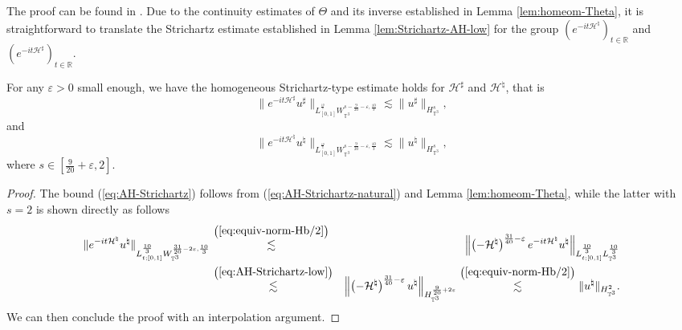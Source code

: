 The proof can be found in \cite[Lemma 3.5]{de2025stochastic}. Due to the continuity estimates of $\Theta$ and its inverse established in
Lemma \ref{lem:homeom-Theta}, it is straightforward to translate the
Strichartz estimate established in Lemma \ref{lem:Strichartz-AH-low} for the
group $(e^{- i t \mathcal{H}^{\natural}})_{t \in \mathbb{R}}$ and $(e^{- i t
\mathcal{H}^{\sharp}})_{t \in \mathbb{R}}$.

\begin{cor}
  \label{cor:anderson-strichartz}For any $\varepsilon > 0$ small enough, we have the
  homogeneous Strichartz-type estimate holds for $\mathcal{H}^{\sharp}$ and
  $\mathcal{H}^{\natural}$, that is
  \begin{equation}
    \| e^{- i t \mathcal{H}^{\sharp}} u^{\sharp} \|_{L_{[0,
    1]}^{^{\frac{10}{3}}} W_{\mathbb{T}^3}^{s - \frac{9}{20} - \varepsilon,
    \frac{10}{3}}} \lesssim \| u^{\sharp} \|_{H_{\mathbb{T}^3}^s},
    \label{eq:AH-Strichartz}
  \end{equation}
  and
  \begin{equation}
    \| e^{- i t \mathcal{H}^{\natural}} u^{\natural} \|_{L_{[0,
    1]}^{^{\frac{10}{3}}} W_{\mathbb{T}^3}^{s - \frac{9}{20} - \varepsilon,
    \frac{10}{3}}} \lesssim \| u^{\natural} \|_{H_{\mathbb{T}^3}^s},
    \label{eq:AH-Strichartz-natural}
  \end{equation}
  where $s \in \left[ \frac{9}{20} + \varepsilon, 2 \right]$. 
\end{cor}

\begin{proof}
  The bound (\ref{eq:AH-Strichartz}) follows from
  (\ref{eq:AH-Strichartz-natural}) and Lemma \ref{lem:homeom-Theta}, while the
  latter with $s = 2$ is shown directly as follows
  \begin{eqnarray*}
    \| e^{- i t \mathcal{H}^{\natural}} u^{\natural} \|_{L_{t ; [0,
    1]}^{^{\frac{10}{3}}} W_{\mathbb{T}^3}^{\frac{31}{20} - 2 \varepsilon,
    \frac{10}{3}}} & \overset{\left( \ref{eq:equiv-norm-Hb/2}
    \right)}{\lesssim} & \left\| \left( - \mathcal{H}^{\natural} \right)
    ^{\frac{31}{40} - \varepsilon} e^{- i t \mathcal{H}^{\natural}}
    u^{\natural} \right\|_{L_{t ; [0, 1]}^{^{\frac{10}{3}}}
    L_{\mathbb{T}^3}^{\frac{10}{3}}}\\
    & \overset{\left( \ref{eq:AH-Strichartz-low} \right)}{\lesssim} & \left\|
    \left( - \mathcal{H}^{\natural} \right)^{\frac{31}{40} - \varepsilon}
    u^{\natural} \right\|_{H_{\mathbb{T}^3}^{\frac{9}{20} + 2 \varepsilon}}
    \overset{\left( \ref{eq:equiv-norm-Hb/2} \right)}{\lesssim} \|
    u^{\natural} \|_{H_{\mathbb{T}^3}^2} .
  \end{eqnarray*}
  We can then conclude the proof with an interpolation argument. 
\end{proof}

